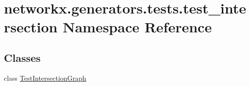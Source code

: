 \hypertarget{namespacenetworkx_1_1generators_1_1tests_1_1test__intersection}{}\section{networkx.\+generators.\+tests.\+test\+\_\+intersection Namespace Reference}
\label{namespacenetworkx_1_1generators_1_1tests_1_1test__intersection}
\subsection*{Classes}
\begin{DoxyCompactItemize}
\item 
class \hyperlink{classnetworkx_1_1generators_1_1tests_1_1test__intersection_1_1TestIntersectionGraph}{Test\+Intersection\+Graph}
\end{DoxyCompactItemize}
